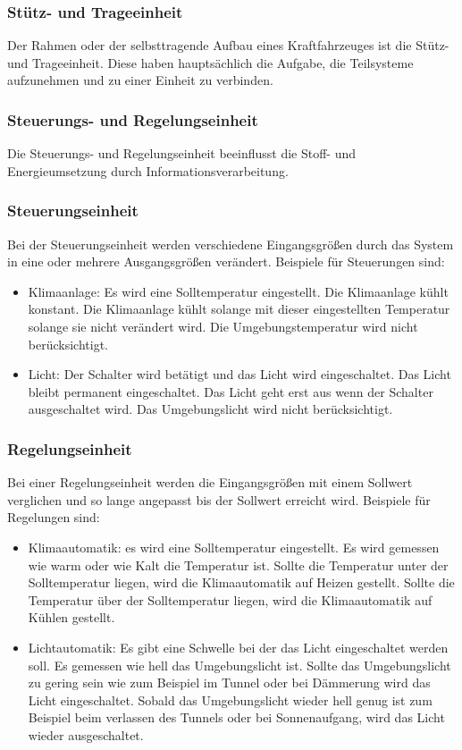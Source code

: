 \subsubsection{Stütz- und Trageeinheit}
Der Rahmen oder der selbsttragende Aufbau eines Kraftfahrzeuges ist die Stütz- und Trageeinheit.
Diese haben hauptsächlich die Aufgabe, die Teilsysteme aufzunehmen und zu einer Einheit zu verbinden.

\subsubsection{Steuerungs- und Regelungseinheit}
Die Steuerungs- und Regelungseinheit beeinflusst die Stoff- und Energieumsetzung durch Informationsverarbeitung.

\subsubsection{Steuerungseinheit}
Bei der Steuerungseinheit werden verschiedene Eingangsgrößen durch das System in eine oder mehrere Ausgangsgrößen verändert.
Beispiele für Steuerungen sind:
\begin{itemize}
	\item Klimaanlage: Es wird eine Solltemperatur eingestellt.
	      Die Klimaanlage kühlt konstant.
	      Die Klimaanlage kühlt solange mit dieser eingestellten Temperatur solange sie nicht verändert wird.
	      Die Umgebungstemperatur wird nicht berücksichtigt.
	\item Licht: Der Schalter wird betätigt und das Licht wird eingeschaltet.
	      Das Licht bleibt permanent eingeschaltet.
	      Das Licht geht erst aus wenn der Schalter ausgeschaltet wird.
	      Das Umgebungslicht wird nicht berücksichtigt.
\end{itemize}

\newpage

\subsubsection{Regelungseinheit}
Bei einer Regelungseinheit werden die Eingangsgrößen mit einem Sollwert verglichen und so lange angepasst bis der Sollwert erreicht wird.
Beispiele für Regelungen sind:
\begin{itemize}
	\item Klimaautomatik: es wird eine Solltemperatur eingestellt.
	      Es wird gemessen wie warm oder wie Kalt die Temperatur ist.
	      Sollte die Temperatur unter der Solltemperatur liegen, wird die Klimaautomatik auf Heizen gestellt.
	      Sollte die Temperatur über der Solltemperatur liegen, wird die Klimaautomatik auf Kühlen gestellt.
	\item Lichtautomatik: Es gibt eine Schwelle bei der das Licht eingeschaltet werden soll.
	      Es gemessen wie hell das Umgebungslicht ist.
	      Sollte das Umgebungslicht zu gering sein wie zum Beispiel im Tunnel oder bei Dämmerung wird das Licht eingeschaltet.
	      Sobald das Umgebungslicht wieder hell genug ist zum Beispiel beim verlassen des Tunnels oder bei Sonnenaufgang, wird das Licht wieder ausgeschaltet.
\end{itemize}
